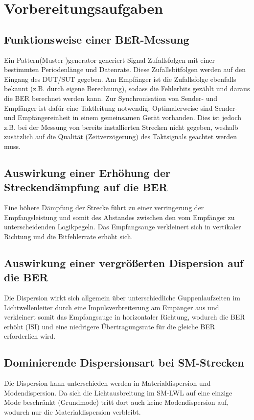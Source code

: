 \documentclass[11pt, a4paper]{article}
\begin{document}
\section{Vorbereitungsaufgaben}
\subsection{Funktionsweise einer BER-Messung}
Ein Pattern(Muster-)generator generiert Signal-Zufallsfolgen mit einer bestimmten
Periodenlänge und Datenrate. Diese Zufallsbitfolgen werden auf den Eingang des DUT/SUT gegeben. Am Empfänger ist die Zufallsfolge ebenfalls bekannt (z.B. durch
eigene Berechnung), sodass die Fehlerbits gezählt und daraus die BER
berechnet werden kann. Zur Synchronisation von Sender- und Empfänger
ist dafür eine Taktleitung notwendig. Optimalerweise sind Sender- und
Empfängereinheit in einem gemeinsamen Gerät vorhanden. Dies ist jedoch z.B.
bei der Messung von bereits installierten Strecken nicht gegeben, weshalb
zusätzlich auf die Qualität (Zeitverzögerung) des Taktsignals geachtet
werden muss.

\subsection{Auswirkung einer Erhöhung der Streckendämpfung auf die BER}
Eine höhere Dämpfung der Strecke führt zu einer verringerung der
Empfangsleistung und somit des Abstandes zwischen den vom Empfänger zu
unterscheidenden Logikpegeln. Das Empfangsauge verkleinert sich in vertikaler
Richtung und die Bitfehlerrate erhöht sich.


\subsection{Auswirkung einer vergrößerten Dispersion auf die BER}
Die Dispersion wirkt sich allgemein über unterschiedliche
Guppenlaufzeiten im Lichtwellenleiter durch eine Impulsverbreiterung am Empänger
aus und verkleinert somit das Empfangsauge in horizontaler Richtung,
wodurch die BER erhöht (ISI) und eine niedrigere Übertragungsrate für
die gleiche BER erforderlich wird.

\subsection{Dominierende Dispersionsart bei SM-Strecken}
Die Dispersion kann unterschieden werden in Materialdispersion und
Modendispersion. Da sich die Lichtausbreitung im SM-LWL auf eine einzige Mode
beschränkt (Grundmode) tritt dort auch keine Modendispersion auf, wodurch
nur die Materialdispersion verbleibt.
\end{document}
